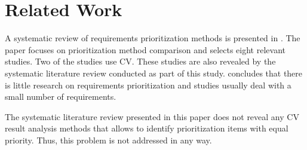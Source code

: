 \section{Related Work\label{relatedwork}}

A systematic review of requirements prioritization methods is presented in \citep{Khan2006}. The paper focuses on prioritization method comparison and selects eight relevant studies. Two of the studies use CV. These studies are also revealed by the systematic literature review conducted as part of this study. \citet{Khan2006} concludes that there is little research on requirements prioritization and studies usually deal with a small number of requirements.

The systematic literature review presented in this paper does not reveal any CV result analysis methods that allows to identify prioritization items with equal priority. Thus, this problem is not addressed in any way.
